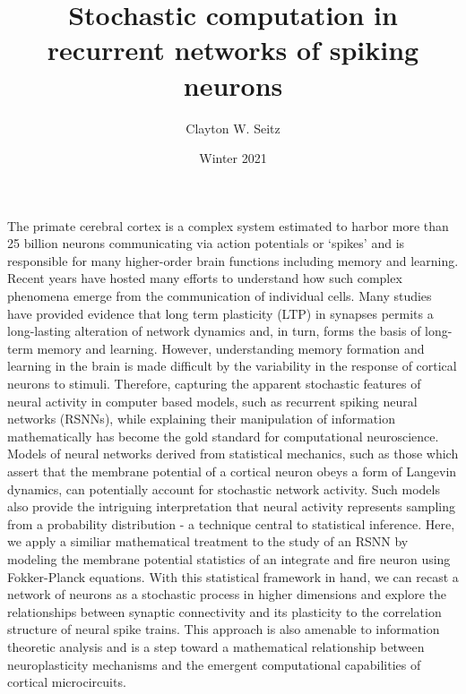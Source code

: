 \documentclass{ucetd}
\title{Stochastic computation in recurrent networks of spiking neurons}
\author{Clayton W. Seitz}
\date{Winter 2021}
\begin{document}
\maketitle

\makecopyright
\makeepigraph


\tableofcontents

\acknowledgments

\abstract

The primate cerebral cortex is a complex system estimated to harbor more than 25 billion neurons communicating via action potentials or `spikes' and is responsible for many higher-order brain functions including memory and learning. Recent years have hosted many efforts to understand how such complex phenomena emerge from the communication of individual cells. Many studies have provided evidence that long term plasticity (LTP) in synapses permits a long-lasting alteration of network dynamics and, in turn, forms the basis of long-term memory and learning. However, understanding memory formation and learning in the brain is made difficult by the variability in the response of cortical neurons to stimuli. Therefore, capturing the apparent stochastic features of neural activity in computer based models, such as recurrent spiking neural networks (RSNNs), while explaining their manipulation of information mathematically has become the gold standard for computational neuroscience. Models of neural networks derived from statistical mechanics, such as those which assert that the membrane potential of a cortical neuron obeys a form of Langevin dynamics, can potentially account for stochastic network activity. Such models also provide the intriguing interpretation that neural activity represents sampling from a probability distribution - a technique central to statistical inference.  Here, we apply a similiar mathematical treatment to the study of an RSNN by modeling the membrane potential statistics of an integrate and fire neuron using Fokker-Planck equations. With this statistical framework in hand, we can recast a network of neurons as a stochastic process in higher dimensions and explore the relationships between synaptic connectivity and its plasticity to the correlation structure of neural spike trains. This approach is also amenable to information theoretic analysis and is a step toward a mathematical relationship between neuroplasticity mechanisms and the emergent computational capabilities of cortical microcircuits.
\end{document}
